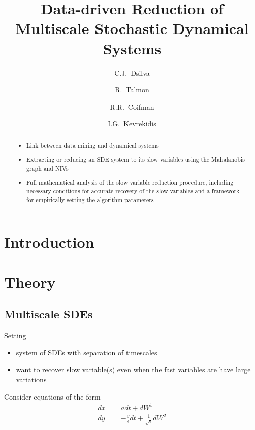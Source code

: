\documentclass[1p]{elsarticle}
\title{Data-driven Reduction of Multiscale Stochastic Dynamical Systems }
\author[PrincetonCBE]{C.J.~Dsilva}
\author[YaleMath]{R.~Talmon}
\author[YaleMath]{R.R.~Coifman}
\author[PrincetonCBE, PrincetonPACM]{I.G.~Kevrekidis\corref{cor1}}
\begin{document}
\begin{abstract}

\begin{itemize}

\item Link between data mining and dynamical systems

\item Extracting or reducing an SDE system to its slow variables using the Mahalanobis graph and NIVs

\item Full mathematical analysis of the slow variable reduction procedure, including necessary conditions for accurate recovery of the slow variables and a framework for empirically setting the algorithm parameters

\end{itemize}

\end{abstract}


\begin{keyword}
 
\end{keyword}

\maketitle

\section{Introduction}

\section{Theory}

\subsection{Multiscale SDEs}

Setting
\begin{itemize}
\item system of SDEs with separation of timescales
\item want to recover slow variable(s) even when the fast variables are have large variations
\end{itemize}

Consider equations of the form
\begin{equation} \label{eq:fast_slow_SDE}
\begin{aligned}
dx &= adt + dW^1\\
dy &= -\frac{y}{\epsilon} dt + \frac{1}{\sqrt{\epsilon}} dW^2
\end{aligned}
\end{equation}
\end{document}
